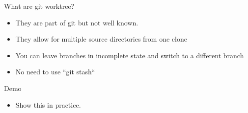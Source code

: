 \documentclass{beamer}
\begin{document}
\begin{frame}{What are git worktree?}
  \begin{itemize}
    \item They are part of git but not well known.
    \item They allow for multiple source directories from one clone
    \item You can leave branches in incomplete state and switch to a
      different branch 
    \item No need to use ``git stash``
  \end{itemize}
\end{frame}

\begin{frame}{Demo}
  \begin{itemize}
    \item Show this in practice.
  \end{itemize}
\end{frame}
\end{document}
